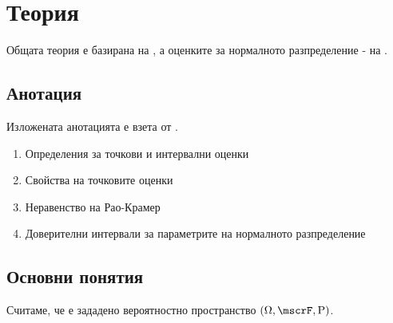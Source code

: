 \documentclass{../../common/topic}
\begin{document}
\maketitle

\section{Теория}

Общата теория е базирана на \cite{ДимитровЯнев2007}, а оценките за нормалното разпределение - на \cite{Въндев2002ЛекцииТом1}.

\subsection{Анотация}

Изложената анотацията е взета от \cite{Syllabus}.

\begin{enumerate}
  \item Определения за точкови и интервални оценки
  \item Свойства на точковите оценки
  \item Неравенство на Рао-Крамер
  \item Доверителни интервали за параметрите на нормалното разпределение
\end{enumerate}

\subsection{Основни понятия}

Считаме, че е зададено вероятностно пространство \( (\Omega, \mscrF, \Prob) \).
\end{document}
